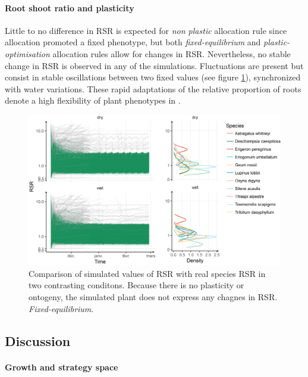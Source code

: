 
\paragraph{Root shoot ratio and plasticity}

Little to no difference in RSR is expected for \textit{non plastic} allocation rule since allocation promoted a fixed phenotype, but both \textit{fixed-equilibrium} and \textit{plastic-optimisation} allocation rules allow for changes in RSR. Nevertheless, no stable change in RSR is observed in any of the simulations. Fluctuations are present but consist in stable oscillations between two fixed values (see figure \ref{fig:comparison_RSR}), synchronized with water variations. These rapid adaptations of the relative proportion of roots denote a high flexibility of plant phenotypes in \model.


\begin{figure}\label{fig:comparison_RSR}
\includegraphics[width = \textwidth]{./2_PP/Figures/Calibration/RSR_full_sim_f-e.png}
\caption{Comparison of simulated values of RSR with real species RSR in two contrasting conditons. Because there is no plasticity or ontogeny, the simulated plant does not express any chagnes in RSR. \textit{Fixed-equilibrium}.}
\end{figure}


\vspace{2cm}

\subsection{Discussion}

\paragraph{Growth and strategy space}

